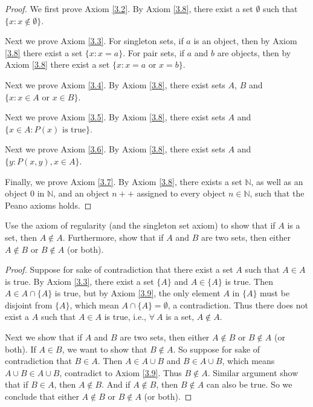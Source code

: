 \begin{proof}
We first prove Axiom \ref{3.2}.
By Axiom \ref{3.8}, there exist a set \(\emptyset\) such that \(\{x: x \notin \emptyset\}\).

Next we prove Axiom \ref{3.3}.
For singleton sets, if \(a\) is an object, then by Axiom \ref{3.8} there exist a set \(\{x: x = a\}\).
For pair sets, if \(a\) and \(b\) are objects, then by Axiom \ref{3.8} there exist a set \(\{x: x = a \text{ or } x = b\}\).

Next we prove Axiom \ref{3.4}.
By Axiom \ref{3.8}, there exist sets \(A\), \(B\) and \(\{x : x \in A \text{ or } x \in B\}\).

Next we prove Axiom \ref{3.5}.
By Axiom \ref{3.8}, there exist sets \(A\) and \(\{x \in A : P(x) \text{ is true}\}\).

Next we prove Axiom \ref{3.6}.
By Axiom \ref{3.8}, there exist sets \(A\) and \(\{y : P(x, y), x \in A\}\).

Finally, we prove Axiom \ref{3.7}.
By Axiom \ref{3.8}, there exists a set \(\mathds{N}\), as well as an object \(0\) in \(\mathds{N}\), and an object \(n++\) assigned to every object \(n \in \mathds{N}\), such that the Peano axioms holds.
\end{proof}

\begin{exercise}\label{ex 3.2.2}
Use the axiom of regularity (and the singleton set axiom) to show that if \(A\) is a set, then \(A \notin A\).
Furthermore, show that if \(A\) and \(B\) are two sets, then either \(A \notin B\) or \(B \notin A\) (or both).
\end{exercise}

\begin{proof}
Suppose for sake of contradiction that there exist a set \(A\) such that \(A \in A\) is true.
By Axiom \ref{3.3}, there exist a set \(\{A\}\) and \(A \in \{A\}\) is true.
Then \(A \in A \cap \{A\}\) is true, but by Axiom \ref{3.9}, the only element \(A\) in \(\{A\}\) must be disjoint from \(\{A\}\), which mean \(A \cap \{A\} = \emptyset\), a contradiction.
Thus there does not exist a \(A\) such that \(A \in A\) is true, i.e., \(\forall\ A\) is a set, \(A \notin A\).

Next we show that if \(A\) and \(B\) are two sets, then either \(A \notin B\) or \(B \notin A\) (or both).
If \(A \in B\), we want to show that \(B \notin A\).
So suppose for sake of contradiction that \(B \in A\).
Then \(A \in A \cup B\) and \(B \in A \cup B\), which means \(A \cup B \in A \cup B\), contradict to Axiom \ref{3.9}.
Thus \(B \notin A\).
Similar argument show that if \(B \in A\), then \(A \notin B\).
And if \(A \notin B\), then \(B \notin A\) can also be true.
So we conclude that either \(A \notin B\) or \(B \notin A\) (or both).
\end{proof}

